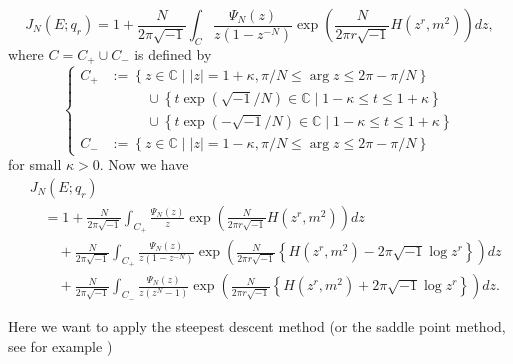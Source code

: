\documentclass[a4paper]{amsart}
\theoremstyle{plain}
\theoremstyle{definition}
\theoremstyle{remark}
\newcommand{\C}{\mathbb{C}}
\numberwithin{equation}{section}
\begin{document}
\begin{equation*}   J_N(E;q_r)   =   1+   \frac{N}{2\pi\sqrt{-1}}   \int_{C}   \frac{\Psi_N(z)}{z(1-z^{-N})}   \exp   \left(\frac{N}{2\pi{r}\sqrt{-1}}H(z^r,m^2)\right)   dz, \end{equation*} where $C=C_{+}{\cup}C_{-}$ is defined by
\begin{equation*}
\begin{cases}
  C_{+}&:=
  \left\{
    z\in\C\mid|z|=1+\kappa,\pi/N\le\arg{z}\le2\pi-\pi/N
  \right\}
  \\
  &\phantom{:=}\quad
  \cup
  \left\{
    t\exp( \sqrt{-1}/N)\in\C\mid1-\kappa\le{t}\le1+\kappa
  \right\}
  \\
  &\phantom{:=}\quad
  \cup
  \left\{
    t\exp(-\sqrt{-1}/N)\in\C\mid1-\kappa\le{t}\le1+\kappa
  \right\}
  \\
  C_{-}&:=
  \left\{
    z\in\C\mid|z|=1-\kappa,\pi/N\le\arg{z}\le2\pi-\pi/N
  \right\}
\end{cases}
\end{equation*}
for small $\kappa>0$.
Now we have
\begin{equation*}
\begin{split}
  &J_N(E;q_r)
  \\   &\quad=
  1+
  \frac{N}{2\pi\sqrt{-1}}
  \int_{C_{+}}
  \frac{\Psi_N(z)}{z}
  \exp
  \left(\frac{N}{2\pi{r}\sqrt{-1}}H(z^r,m^2)\right)
  dz
  \\
  &\quad\quad
  +
  \frac{N}{2\pi\sqrt{-1}}
  \int_{C_{+}}
  \frac{\Psi_N(z)}{z(1-z^{-N})}
  \exp
  \left(
    \frac{N}{2\pi{r}\sqrt{-1}}
    \left\{
      H(z^r,m^2)
      -
      2\pi\sqrt{-1}\log{z^r}
    \right\}
  \right)
  dz
  \\
  &\quad\quad
  +
  \frac{N}{2\pi\sqrt{-1}}
  \int_{C_{-}}
  \frac{\Psi_N(z)}{z(z^{N}-1)}
  \exp
  \left(
    \frac{N}{2\pi{r}\sqrt{-1}}
    \left\{
      H(z^r,m^2)
      +
      2\pi\sqrt{-1}\log{z^r}
    \right\}
  \right)
  dz.
\end{split}
\end{equation*}
\par
Here we want to apply the steepest descent method
(or the saddle point method, see for example
\cite[Theorem 7.2.9]{Marsden/Hoffman:Complex_Analysis})
\end{document}

